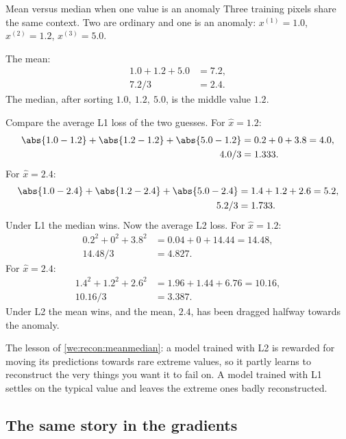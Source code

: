 \begin{worked}[label={we:recon:meanmedian}]{Mean versus median when one value is an anomaly}
Three training pixels share the same context. Two are ordinary and one is an anomaly:
$x^{(1)}=1.0$, $x^{(2)}=1.2$, $x^{(3)}=5.0$.

The mean:
\begin{align*}
1.0 + 1.2 + 5.0 &= 7.2,\\
7.2 / 3 &= 2.4.
\end{align*}
The median, after sorting $1.0,\ 1.2,\ 5.0$, is the middle value $1.2$.

Compare the average L1 loss of the two guesses. For $\hat{x}=1.2$:
\begin{align*}
\abs{1.0-1.2} + \abs{1.2-1.2} + \abs{5.0-1.2} &= 0.2 + 0 + 3.8 = 4.0,\\
4.0/3 &= 1.333.
\end{align*}
For $\hat{x}=2.4$:
\begin{align*}
\abs{1.0-2.4} + \abs{1.2-2.4} + \abs{5.0-2.4} &= 1.4 + 1.2 + 2.6 = 5.2,\\
5.2/3 &= 1.733.
\end{align*}
Under L1 the median wins. Now the average L2 loss. For $\hat{x}=1.2$:
\begin{align*}
0.2^2 + 0^2 + 3.8^2 &= 0.04 + 0 + 14.44 = 14.48,\\
14.48/3 &= 4.827.
\end{align*}
For $\hat{x}=2.4$:
\begin{align*}
1.4^2 + 1.2^2 + 2.6^2 &= 1.96 + 1.44 + 6.76 = 10.16,\\
10.16/3 &= 3.387.
\end{align*}
Under L2 the mean wins, and the mean, $2.4$, has been dragged halfway towards the anomaly.
\end{worked}

The lesson of \cref{we:recon:meanmedian}: a model trained with L2 is rewarded for moving its
predictions towards rare extreme values, so it partly learns to reconstruct the very things you want
it to fail on. A model trained with L1 settles on the typical value and leaves the extreme ones badly
reconstructed.

\subsection{The same story in the gradients}

